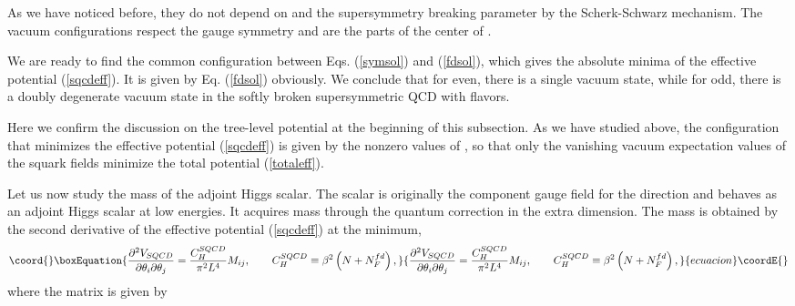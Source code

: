 \documentclass[a4paper,12pt]{article}
\begin{document}
As we have noticed before, they do not depend on \coordHE{} and the 
supersymmetry breaking parameter \myHighlight{$\beta$}\coordHE{} by 
the Scherk-Schwarz mechanism. 
The vacuum configurations 
respect the \coordHE{} gauge symmetry and are the parts of the center
of \coordHE{}. 
\par
We are ready to find the common configuration
between Eqs. (\ref{symsol}) and (\ref{fdsol}), which gives 
the absolute minima of the effective potential (\ref{sqcdeff}).
It is given by Eq. (\ref{fdsol}) obviously.
We conclude that for \coordHE{} even, there is a single vacuum state, while 
for \coordHE{} odd, there is a doubly degenerate vacuum state 
in the softly broken supersymmetric QCD with \coordHE{} flavors. 
\par
Here we confirm the discussion on the tree-level potential 
at the beginning of this subsection. As we have studied above, the 
configuration that minimizes the effective 
potential (\ref{sqcdeff}) is given by the nonzero 
values of \coordHE{}, so that 
only the vanishing vacuum expectation values of the
squark fields minimize the total potential (\ref{totaleff}).
\par
Let us now study the mass of the adjoint Higgs scalar. The scalar
is originally the component gauge field for the \coordHE{} direction 
and behaves as an adjoint Higgs scalar at low energies.
It acquires mass through the quantum correction in the extra dimension.
The mass is obtained by the second derivative 
of the effective potential (\ref{sqcdeff}) at the minimum,
\begin{equation}\coord{}\boxEquation{
{{\del^2V_{SQCD}}\over{\del\theta_i\del\theta_j}}
={{C_H^{SQCD}}\over{\pi^2 L^4}}M_{ij},\qquad C_H^{SQCD}\equiv 
\beta^2\left(N+N_F^{fd}\right),
}{
{{\del^2V_{SQCD}}\over{\del\theta_i\del\theta_j}}
={{C_H^{SQCD}}\over{\pi^2 L^4}}M_{ij},\qquad C_H^{SQCD}\equiv 
\beta^2\left(N+N_F^{fd}\right),
}{ecuacion}\coordE{}\end{equation}
where the matrix \coordHE{} is given by
\end{document}
